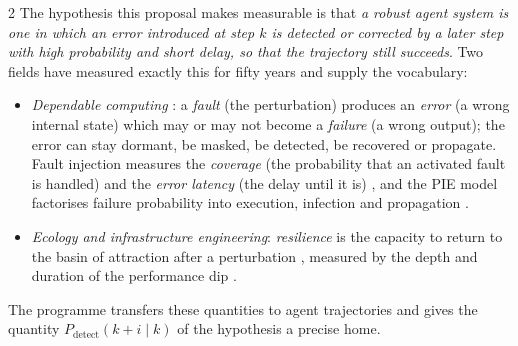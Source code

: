 \begin{multicols}{2}
The hypothesis this proposal makes measurable is that \emph{a robust agent system is one in which an error introduced at step $k$ is detected or corrected by a later step with high probability and short delay, so that the trajectory still succeeds}. Two fields have measured exactly this for fifty years and supply the vocabulary:
\begin{itemize}[leftmargin=1.1em]
\item \emph{Dependable computing} \cite{avizienis2004dependability}: a \emph{fault} (the perturbation) produces an \emph{error} (a wrong internal state) which may or may not become a \emph{failure} (a wrong output); the error can stay dormant, be masked, be detected, be recovered or propagate. Fault injection measures the \emph{coverage} (the probability that an activated fault is handled) and the \emph{error latency} (the delay until it is) \cite{arlat1990fault,powell1995coverage}, and the PIE model factorises failure probability into execution, infection and propagation \cite{voas1992pie}.
\item \emph{Ecology and infrastructure engineering}: \emph{resilience} is the capacity to return to the basin of attraction after a perturbation \cite{holling1973resilience}, measured by the depth and duration of the performance dip \cite{bruneau2003resilience}.
\end{itemize}
The programme transfers these quantities to agent trajectories and gives the quantity $P_{\mathrm{detect}}(k{+}i\mid k)$ of the hypothesis a precise home.


\end{multicols}
